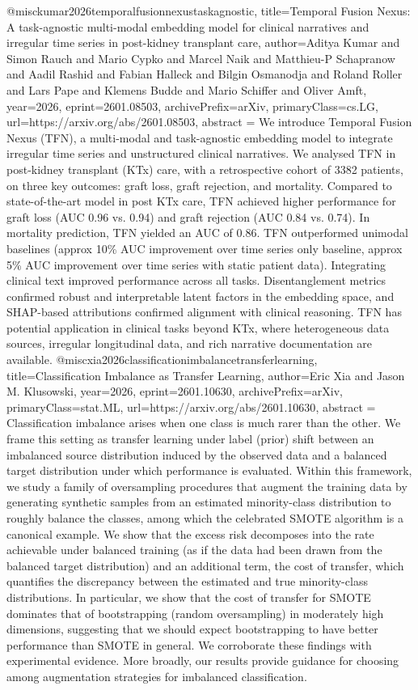 {}@misc{kumar2026temporalfusionnexustaskagnostic,
      title={Temporal Fusion Nexus: A task-agnostic multi-modal embedding model for clinical narratives and irregular time series in post-kidney transplant care}, 
      author={Aditya Kumar and Simon Rauch and Mario Cypko and Marcel Naik and Matthieu-P Schapranow and Aadil Rashid and Fabian Halleck and Bilgin Osmanodja and Roland Roller and Lars Pape and Klemens Budde and Mario Schiffer and Oliver Amft},
      year={2026},
      eprint={2601.08503},
      archivePrefix={arXiv},
      primaryClass={cs.LG},
      url={https://arxiv.org/abs/2601.08503},
      abstract = {We introduce Temporal Fusion Nexus (TFN), a multi-modal and task-agnostic embedding model to integrate irregular time series and unstructured clinical narratives. We analysed TFN in post-kidney transplant (KTx) care, with a retrospective cohort of 3382 patients, on three key outcomes: graft loss, graft rejection, and mortality. Compared to state-of-the-art model in post KTx care, TFN achieved higher performance for graft loss (AUC 0.96 vs. 0.94) and graft rejection (AUC 0.84 vs. 0.74). In mortality prediction, TFN yielded an AUC of 0.86. TFN outperformed unimodal baselines (approx 10\% AUC improvement over time series only baseline, approx 5\% AUC improvement over time series with static patient data). Integrating clinical text improved performance across all tasks. Disentanglement metrics confirmed robust and interpretable latent factors in the embedding space, and SHAP-based attributions confirmed alignment with clinical reasoning. TFN has potential application in clinical tasks beyond KTx, where heterogeneous data sources, irregular longitudinal data, and rich narrative documentation are available.}
}@misc{xia2026classificationimbalancetransferlearning,
      title={Classification Imbalance as Transfer Learning}, 
      author={Eric Xia and Jason M. Klusowski},
      year={2026},
      eprint={2601.10630},
      archivePrefix={arXiv},
      primaryClass={stat.ML},
      url={https://arxiv.org/abs/2601.10630},
      abstract = {Classification imbalance arises when one class is much rarer than the other. We frame this setting as transfer learning under label (prior) shift between an imbalanced source distribution induced by the observed data and a balanced target distribution under which performance is evaluated. Within this framework, we study a family of oversampling procedures that augment the training data by generating synthetic samples from an estimated minority-class distribution to roughly balance the classes, among which the celebrated SMOTE algorithm is a canonical example. We show that the excess risk decomposes into the rate achievable under balanced training (as if the data had been drawn from the balanced target distribution) and an additional term, the cost of transfer, which quantifies the discrepancy between the estimated and true minority-class distributions. In particular, we show that the cost of transfer for SMOTE dominates that of bootstrapping (random oversampling) in moderately high dimensions, suggesting that we should expect bootstrapping to have better performance than SMOTE in general. We corroborate these findings with experimental evidence. More broadly, our results provide guidance for choosing among augmentation strategies for imbalanced classification.}
}
